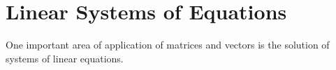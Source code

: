 \section{Linear Systems of Equations}
One important area of application of matrices and vectors is the solution of systems of linear equations.




\begin{comment}

-"Algebra" is generally about solving equations. Questions liek: 
 -How many solutions are there?
 -How can we find them? Is there a systematic algorithm to produce the solutions?
 -Is there some structure to the set of solutions.
  -In case of linear algebra: the structure of the solution set of a linear system of equations is:
   x_g = x_p + x_h where: x_g is the general solution, y_p is a particular solution and y_h is the
   homogeneous solution. The latter is a subspace of the space we are seeking solutions in that is 
   given by the solution of the corresponding
   
\end{comment}